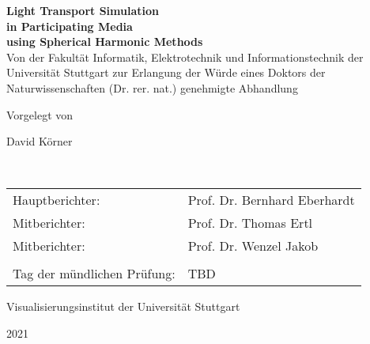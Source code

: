 \begin{titlepage}
 
\begin{center}
	\textbf{\huge Light Transport Simulation}\\ 
	\vspace{0.3cm}
	\textbf{\huge in Participating Media}\\ 
	\vspace{0.3cm}
	\textbf{\huge using Spherical Harmonic Methods}\\
	
	\vspace{1.5cm}	
	\large Von der Fakultät Informatik, Elektrotechnik und Informationstechnik der Universität Stuttgart zur Erlangung der Würde eines Doktors der Naturwissenschaften (Dr. rer. nat.) genehmigte Abhandlung
	
	\vspace{1.8cm}
	Vorgelegt von
	
	\vspace{0.2cm}
	\huge David Körner
	
	\vspace{0.2cm}
	\large \
	
	\vspace{1.8cm}	
	\begin{longtable}{l l}
	Hauptberichter: & Prof. Dr. Bernhard Eberhardt \\
	Mitberichter: & Prof. Dr. Thomas Ertl \\
	Mitberichter: & Prof. Dr. Wenzel Jakob\\
	& 	\\
	Tag der mündlichen Prüfung: & TBD
	\end{longtable}
		
	\vspace{1.5cm}
	Visualisierungsinstitut der Universität Stuttgart
	
	2021
\end{center}
\vspace{1cm}
\begin{flushright}
\end{flushright}
\end{titlepage}


